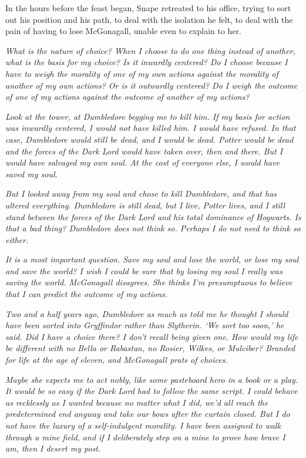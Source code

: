 In the hours before the feast began, Snape retreated to his office, trying to sort out his position and his path, to deal with the isolation he felt, to deal with the pain of having to lose McGonagall, unable even to explain to her.

\emph{What is the nature of choice? When I choose to do one thing instead of another, what is the basis for my choice? Is it inwardly centered? Do I choose because I have to weigh the morality of one of my own actions against the morality of another of my own actions? Or is it outwardly centered? Do I weigh the outcome of one of my actions against the outcome of another of my actions?}

\emph{Look at the tower, at Dumbledore begging me to kill him. If my basis for action was inwardly centered, I would not have killed him. I would have refused. In that case, Dumbledore would still be dead, and I would be dead. Potter would be dead and the forces of the Dark Lord would have taken over, then and there. But I would have salvaged my own soul. At the cost of everyone else, I would have saved my soul.}

\emph{But I looked away from my soul and chose to kill Dumbledore, and that has altered everything. Dumbledore is still dead, but I live, Potter lives, and I still stand between the forces of the Dark Lord and his total dominance of Hogwarts. Is that a bad thing? Dumbledore does not think so. Perhaps I do not need to think so either.}

\emph{It is a most important question. Save my soul and lose the world, or lose my soul and save the world? I wish I could be sure that by losing my soul I really was saving the world. McGonagall disagrees. She thinks I'm presumptuous to believe that I can predict the outcome of my actions.}

\emph{Two and a half years ago, Dumbledore as much as told me he thought I should have been sorted into Gryffindor rather than Slytherin. `We sort too soon,' he said. Did I have a choice there? I don't recall being given one. How would my life be different with no Bella or Rabastan, no Rosier, Wilkes, or Mulciber? Branded for life at the age of eleven, and McGonagall prats of choices.}

\emph{Maybe she expects me to act nobly, like some pasteboard hero in a book or a play. It would be so easy if the Dark Lord had to follow the same script. I could behave as recklessly as I wanted because no matter what I did, we'd all reach the predetermined end anyway and take our bows after the curtain closed. But I do not have the luxury of a self-indulgent morality. I have been assigned to walk through a mine field, and if I deliberately step on a mine to prove how brave I am, then I desert my post.}

